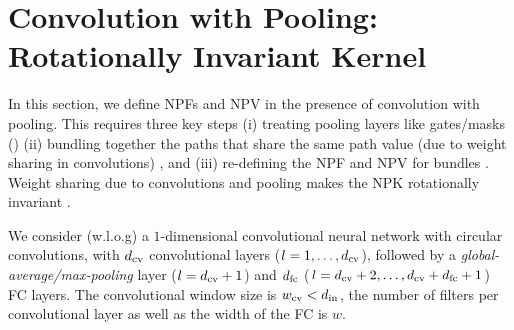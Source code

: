 \section{Convolution with Pooling: Rotationally Invariant Kernel}\label{sec:conv}

In this section, we define NPFs and NPV in the presence of convolution with pooling. This requires three key steps (i) treating pooling layers like gates/masks () (ii) bundling together the paths that share the same path value (due to weight sharing in convolutions) , and (iii) re-defining the NPF and NPV for bundles . Weight sharing due to convolutions and pooling makes the NPK rotationally invariant .

We consider (w.l.o.g) a $1$-dimensional convolutional neural network with circular convolutions, with $d_{\text{cv}}$ convolutional layers ($l=1,\ldots,d_{\text{cv}}$), followed by a \emph{global-average/max-pooling} layer ($l=d_{\text{cv}}+1$) and $d_{\text{fc}}$ ($l=d_{\text{cv}}+2,\ldots,d_{\text{cv}}+d_{\text{fc}}+1$) FC  layers. The convolutional window size is $w_{\text{cv}}<d_{\text{in}}$, the number of filters per convolutional layer as well as the width of the FC is $w$. 

